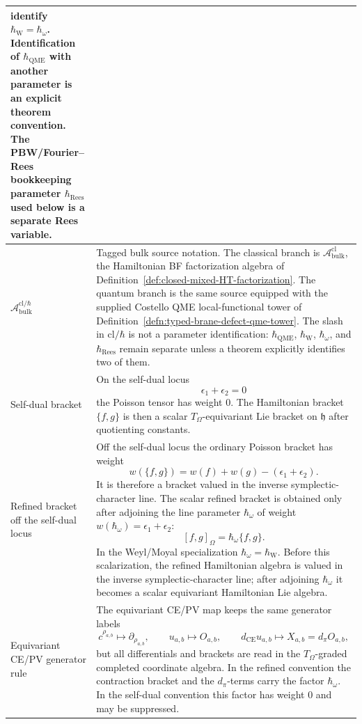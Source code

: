 \begin{longtable}{@{}>{\raggedright\arraybackslash}p{}
  >{\raggedright\arraybackslash}p{}@{}}
	identify \(\hbar_{\mathrm{W}}=\hbar_\omega\).  Identification of
	\(\hbar_{\mathrm{QME}}\) with another parameter is an explicit theorem
	convention.  The PBW/Fourier--Rees bookkeeping parameter
		\(\hbar_{\mathrm{Rees}}\) used below is a separate Rees variable.\\
\hline
\(\mathcal A^{\mathrm{cl}/\hbar}_{\mathrm{bulk}}\) &
Tagged bulk source notation.  The classical branch is
\(\mathcal A^{\mathrm{cl}}_{\mathrm{bulk}}\), the Hamiltonian BF
factorization algebra of Definition~\ref{def:closed-mixed-HT-factorization}.
The quantum branch is the same source equipped with the supplied Costello QME
local-functional tower of Definition~\ref{defn:typed-brane-defect-qme-tower}.
The slash in \(\mathrm{cl}/\hbar\) is not a parameter identification:
\(\hbar_{\mathrm{QME}}\), \(\hbar_{\mathrm{W}}\), \(\hbar_\omega\), and
\(\hbar_{\mathrm{Rees}}\) remain separate unless a theorem explicitly
identifies two of them.\\
\hline
Self-dual bracket &
On the self-dual locus
\[
  \epsilon_1+\epsilon_2=0
\]
the Poisson tensor has weight \(0\).  The Hamiltonian bracket
\(\{f,g\}\) is then a scalar \(T_\Omega\)-equivariant Lie bracket on
\(\mathfrak h\) after quotienting constants.\\
\hline
Refined bracket off the self-dual locus &
Off the self-dual locus the ordinary Poisson bracket has weight
\[
  w(\{f,g\})=w(f)+w(g)-(\epsilon_1+\epsilon_2).
\]
It is therefore a bracket valued in the inverse symplectic-character
line.  The scalar refined bracket is obtained only after adjoining the
line parameter \(\hbar_\omega\) of weight
\(w(\hbar_\omega)=\epsilon_1+\epsilon_2\):
\[
  [f,g]_\Omega=\hbar_\omega\{f,g\}.
\]
In the Weyl/Moyal specialization
\(\hbar_\omega=\hbar_{\mathrm{W}}\).  Before this scalarization, the
refined Hamiltonian algebra is valued in the inverse
symplectic-character line; after adjoining \(\hbar_\omega\) it becomes a
scalar equivariant Hamiltonian Lie algebra.\\
\hline
Equivariant CE/PV generator rule &
The equivariant CE/PV map keeps the same generator labels
\[
  c^{\rho_{a,b}}\mapsto\partial_{\rho_{a,b}},\qquad
  u_{a,b}\mapsto O_{a,b},\qquad
  d_{\mathrm{CE}}u_{a,b}\mapsto
    X_{a,b}=d_\pi O_{a,b},
\]
but all differentials and brackets are read in the \(T_\Omega\)-graded
completed coordinate algebra.  In the refined convention the contraction
bracket and the \(d_\pi\)-terms carry the factor \(\hbar_\omega\).  In the
self-dual convention this factor has weight \(0\) and may be suppressed.\\

\end{longtable}
